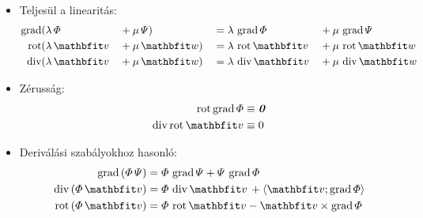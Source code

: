 \documentclass[fleqn]{szb-practice}
\begin{document}
\begin{blueBox}
  \begin{itemize}
    \item Teljesül a linearitás:
          \vspace{-.5em}
          \begin{alignat*}{4}
            \grad & (\lambda \, \varPhi && + \mu \, \varPsi) && = \lambda \, \grad \varPhi && + \mu \, \grad \varPsi
            \\
            \rot  & (\lambda \, \rvec v && + \mu \, \rvec w) && = \lambda \, \rot \rvec v  && + \mu \, \rot \rvec w
            \\
            \Div  & (\lambda \, \rvec v && + \mu \, \rvec w) && = \lambda \, \Div \rvec v  && + \mu \, \Div \rvec w
          \end{alignat*}
          \vspace{-2.5em}

    \item Zérusság:
          \vspace{-.5em}
          \begin{align*}
            \rot \grad \varPhi & \equiv \nvec
            \\
            \Div \rot \rvec v  & \equiv 0
          \end{align*}
          \vspace{-2.5em}

    \item Deriválási szabályokhoz hasonló:
          \vspace{-.5em}
          \begin{align*}
            \grad \left( \varPhi \, \varPsi \right)
             & = \varPhi \, \grad \varPsi
            + \varPsi \, \grad \varPhi
            \\
            \Div \left( \varPhi \, \rvec v \right)
             & = \varPhi \, \Div \rvec v \,
            + \scalar{\rvec v}{\grad \varPhi}
            \\
            \rot \left( \varPhi \, \rvec v \right)
             & = \varPhi \, \rot \rvec v
            - \rvec v \times \grad \varPhi
          \end{align*}
          \vspace{-2.5em}


\end{itemize}
\end{blueBox}
\end{document}
